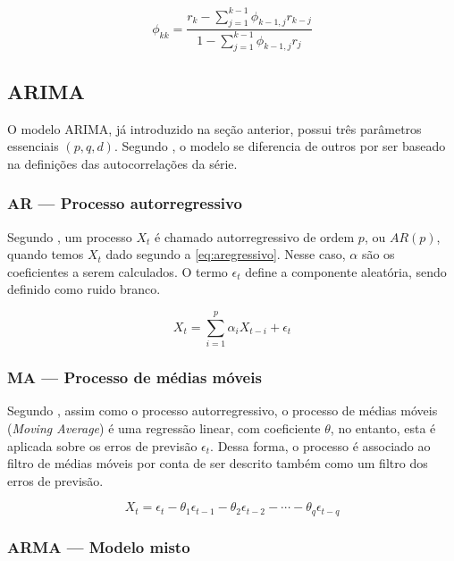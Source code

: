 \documentclass[
    12pt,
    oneside,
    a4paper,
    english,
    brazil
]{abntex2}
\begin{document}
\begin{equation}
    \label{eq:facp}
    \phi_{kk} = \frac{r_k-\sum_{j=1}^{k-1}{\phi_{k-1,j}r_{k-j}}}{1-\sum_{j=1}^{k-1}{\phi_{k-1,j}r_{j}}}
\end{equation}

\subsection{ARIMA}

O  modelo  ARIMA,  já  introduzido  na seção  anterior,  possui  três  parâmetros
essenciais $(p,q,d)$. Segundo , o modelo se diferencia de outros
por ser baseado na definições das autocorrelações da série.

\subsubsection{AR --- Processo autorregressivo}

Segundo  ,  um  processo  $X_t$ é  chamado  autorregressivo
de   ordem   $p$,   ou   $AR(p)$,   quando   temos   $X_t$   dado   segundo   a
\autoref{eq:aregressivo}.  Nesse caso,  $\alpha$  são os  coeficientes a  serem
calculados. O termo $\epsilon_t$ define  a componente aleatória, sendo definido
como ruido branco.

\begin{equation}
    \label{eq:aregressivo}
    X_t = \sum_{i = 1}^{p}{\alpha_{i}X_{t-i}} + \epsilon_t
\end{equation}

\subsubsection{MA --- Processo de médias móveis}

Segundo , assim como o processo autorregressivo, o processo de médias móveis (\textit{Moving Average}) é uma regressão linear, com  coeficiente $\theta$, no entanto, esta é aplicada sobre os erros de  previsão $\epsilon_t$. Dessa forma, o processo é associado ao filtro  de médias móveis por conta de ser descrito também como um filtro dos erros de previsão.

\begin{equation}
    \label{eq:pmediasmoveis}
    X_t = \epsilon_t - \theta_1\epsilon_{t-1} - \theta_2\epsilon_{t-2} - \cdots - \theta_{q}\epsilon_{t-q}
\end{equation}

\subsubsection{ARMA --- Modelo misto}
\end{document}
